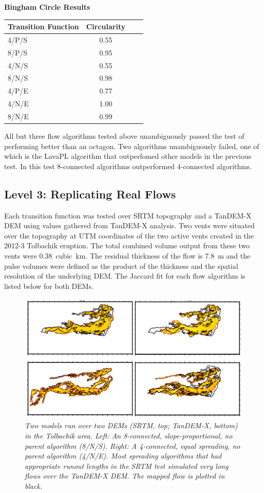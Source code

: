 \documentclass[12pt,letter]{article}
\begin{document}
		
		\begin{center}
			\textbf{Bingham Circle Results}\\
			\begin{tabular}{l c c c}
				\toprule
				Transition Function&Circularity\\
				\midrule
				4/P/S & 0.55\\
				8/P/S & 0.95\\
				4/N/S & 0.55\\
				8/N/S & 0.98\\
				4/P/E & 0.77\\
				4/N/E & 1.00\\
				8/N/E & 0.99\\
				
				\bottomrule
			\end{tabular}
		\end{center}
		
		All but three flow algorithms tested above unambiguously passed the test of performing better than an octagon. Two algorithms unambiguously failed, one of which is the LavaPL algorithm that outperfomed other models in the previous test. In this test 8-connected algorithms outperformed 4-connected algorithms.

	\subsection{Level 3: Replicating Real Flows}
	
	Each transition function was tested over SRTM topography and a TanDEM-X DEM using values gathered from TanDEM-X analysis. Two vents were situated over the topography at UTM coordinates of the two active vents created in the 2012-3 Tolbachik eruption. The total combined volume output from these two vents were 0.38~cubic~km. The residual thickness of the flow is 7.8~m and the pulse volumes were defined as the product of the thickness and the spatial resolution of the underlying DEM. The Jaccard fit for each flow algorithm is listed below for both DEMs.
		\begin{figure}[!h]
			\centering
			\includegraphics[width=0.7\linewidth]{tolbachik}
			\caption{\textit{Two models run over two DEMs (SRTM, top; TanDEM-X, bottom) in the Tolbachik area. Left: An 8-connected, slope-proportional, no parent algorithm (8/N/S). Right: A 4-connected, equal spreading, no parent algorithm (4/N/E). Most spreading algorithms that had appropriate runout lengths in the SRTM test simulated very long flows over the TanDEM-X DEM. The mapped flow is plotted in black.}}
			\label{fig:tolbachik}
		\end{figure}
		
\end{document}
